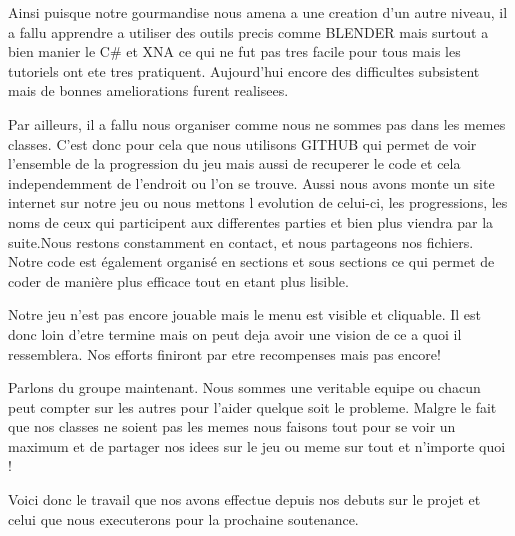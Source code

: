 \documentclass{article}
\begin{document}
\par
Ainsi puisque notre gourmandise nous amena a une creation d'un autre niveau, il a fallu apprendre a utiliser des outils precis comme BLENDER mais surtout a bien manier le C\# et XNA ce qui ne fut pas tres facile pour tous mais les tutoriels ont ete tres pratiquent. Aujourd'hui encore des difficultes subsistent mais de bonnes ameliorations furent realisees.
\newline

\par
Par ailleurs, il a fallu nous organiser comme nous ne sommes pas dans les memes classes. C'est donc pour cela que nous utilisons GITHUB qui permet de voir l'ensemble de la progression du jeu mais aussi de recuperer le code et cela independemment de l'endroit ou l'on se trouve. Aussi nous avons monte un site internet sur notre jeu ou nous mettons l evolution de celui-ci, les progressions, les noms de ceux qui participent aux differentes parties et bien plus viendra par la suite.Nous restons constamment en contact, et nous partageons nos fichiers. Notre code est également organisé en sections et sous sections ce qui permet de coder de manière plus efficace tout en etant  plus lisible.
\newline

\par
Notre jeu n'est pas encore jouable mais le menu est visible et cliquable. Il est donc loin d'etre termine mais on peut deja avoir une vision de ce a quoi il ressemblera. Nos efforts finiront par etre recompenses mais pas encore!
\newline

\par
Parlons du groupe maintenant. Nous sommes une veritable equipe ou chacun peut compter sur les autres pour l'aider quelque soit le probleme. Malgre le fait que nos classes ne soient pas les memes nous faisons tout pour se voir un maximum et de partager nos idees sur le jeu ou meme sur tout et n'importe quoi !
\newline

\par
Voici donc le travail que nos avons effectue depuis nos debuts sur le projet et celui que nous executerons pour la prochaine soutenance.

\newpage
\end{document}

